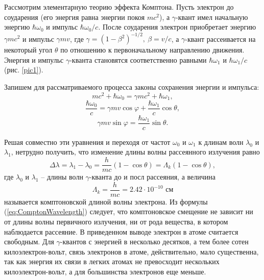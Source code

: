 \documentclass[a4paper,12pt]{article}
\begin{document}
Рассмотрим элементарную теорию эффекта Комптона. Пусть электрон до соударения (его энергия равна энергии покоя $mc^2$), а $\gamma$-квант имел начальную энергию $\hbar\omega_0$ и импульс $\hbar\omega_0/c$. После соударения электрон приобретает энергию $\gamma mc^2$ и импульс $\gamma mv$, где $\gamma=(1-\beta^2)^{-1/2},\ \beta=v/c$, а $\gamma$-квант рассеивается на некоторый угол $\theta$ по отношению к первоначальному направлению движения. Энергия и импульс $\gamma$-кванта становятся соответственно равными $\hbar\omega_1$ и $\hbar\omega_1/c$ (рис. \ref{pic1}).\par
Запишем для рассматриваемого процесса законы сохранения энергии и импульса:
\begin{equation*}
	mc^2+\hbar\omega_0=\gamma mc^2+\hbar\omega_1,
\end{equation*}
\begin{equation*}
	\frac{\hbar\omega_0}{c}=\gamma mv\cos\varphi+\frac{\hbar\omega_1}{c}\cos\theta,
\end{equation*}
\begin{equation*}
	\gamma mv\sin\varphi=\frac{\hbar\omega_1}{c}\sin\theta.
\end{equation*}
\par
Решая совместно эти уравнения и переходя от частот $\omega_0$ и $\omega_1$ к длинам волн $\lambda_0$ и $\lambda_1$, нетрудно получить, что изменение длины волны рассеянного излучения равно
\begin{equation}
	\Delta\lambda=\lambda_1-\lambda_0=\frac{h}{mc}\left(1-\cos\theta\right)=\Lambda_k\left(1-\cos\theta\right),
	\label{eq:ComptonWavelength}
\end{equation}
где $\lambda_0$ и $\lambda_1$ -- длины волн $\gamma$-кванта до и посл рассеяния, а величина
\begin{equation*}
	\Lambda_k=\frac{h}{mc}=2.42\cdot10^{-10}\text{ см}
\end{equation*}
называется комптоновской длиной волны электрона. Из формулы (\ref{eq:ComptonWavelength}) следует, что комптоновское смещение не зависит ни от длины волны первичного излучения, ни от рода вещества, в котором наблюдается рассеяние. В приведенном выводе электрон в атоме считается свободным. Для $\gamma$-квантов с энергией в несколько десятков, а тем более сотен килоэлектрон-вольт, связь электронов в атоме, действительно, мало существенна, так как энергия их связи в легких атомах не превосходит нескольких килоэлектрон-вольт, а для большинства электронов еще меньше.\par
\end{document}
